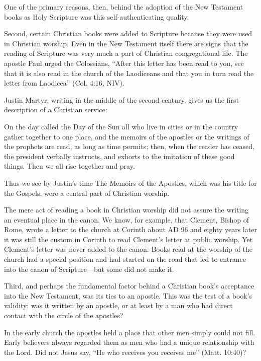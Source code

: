 One of the primary reasons, then, behind the adoption of the New Testament books as Holy Scripture
was this self-authenticating quality.

Second, certain Christian books were added to Scripture because they were used in Christian worship.
Even in the New Testament itself there are signs that the reading of Scripture was very much a part
of Christian congregational life. The apostle Paul urged the Colossians, “After this letter has been
read to you, see that it is also read in the church of the Laodiceans and that you in turn read the
letter from Laodicea” (Col. 4:16, NIV).

Justin Martyr, writing in the middle of the second century, gives us the first description of a
Christian service:

\begin{blockquote}
On the day called the Day of the Sun all who live in cities or in the country gather together to one
place, and the memoirs of the apostles or the writings of the prophets are read, as long as time
permits; then, when the reader has ceased, the president verbally instructs, and exhorts to the
imitation of these good things. Then we all rise together and pray.
\end{blockquote}

\noindent Thus we see by Justin’s time The Memoirs of the Apostles, which was his title for the
Gospels, were a central part of Christian worship.

The mere act of reading a book in Christian worship did not assure the writing an eventual place in
the canon. We know, for example, that Clement, Bishop of Rome, wrote a letter to the church at
Corinth about AD 96 and eighty years later it was still the custom in Corinth to read Clement’s
letter at public worship. Yet Clement’s letter was never added to the canon. Books read at the
worship of the church had a special position and had started on the road that led to entrance into
the canon of Scripture—but some did not make it.

Third, and perhaps the fundamental factor behind a Christian book’s acceptance into the New
Testament, was its ties to an apostle. This was the test of a book’s validity: was it written by an
apostle, or at least by a man who had direct contact with the circle of the apostles?

In the early church the apostles held a place that other men simply could not fill. Early believers
always regarded them as men who had a unique relationship with the Lord. Did not Jesus say, “He who
receives you receives me” (Matt. 10:40)?

